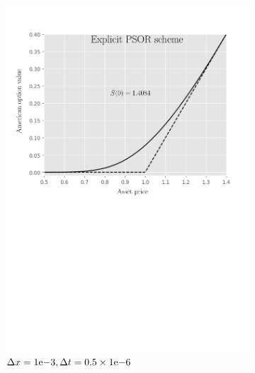 \begin{figure}[tbp]
\begin{subfigure}{0.4\textwidth}
    \includegraphics[width=\textwidth]{chapters/chapter5/TestCase3ExplicitLCP.pdf}
    \caption{$\Delta{x}={1}\mathrm{e}{-3}, \Delta{t}=0.5\times{1}\mathrm{e}{-6}$}
    \label{fig:lcp:numericaresults:test_case_3_explicit}
  \end{subfigure}
  \begin{subfigure}{0.4\textwidth}
    \centering

\end{subfigure}
\end{figure}
